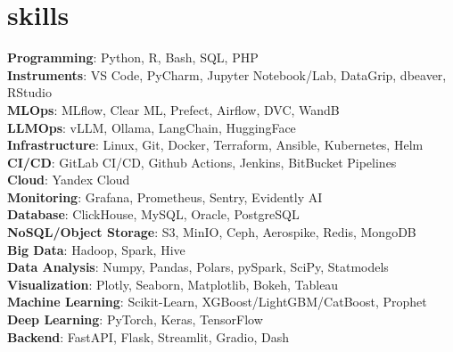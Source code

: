 \section{skills}
\begin{itemize}[leftmargin=0.15in, label={}]
  {\item{
        \textbf{Programming}{: Python, R, Bash, SQL, PHP} \\
        \textbf{Instruments}{: VS Code, PyCharm, Jupyter Notebook/Lab, DataGrip, dbeaver, RStudio} \\
        \textbf{MLOps}{: MLflow, Clear ML, Prefect, Airflow, DVC, WandB} \\
        \textbf{LLMOps}{: vLLM, Ollama, LangChain, HuggingFace} \\
        \textbf{Infrastructure}{: Linux, Git, Docker, Terraform, Ansible, Kubernetes, Helm} \\
        \textbf{CI/CD}{: GitLab CI/CD, Github Actions, Jenkins, BitBucket Pipelines} \\
        \textbf{Cloud}{: Yandex Cloud} \\
        \textbf{Monitoring}{: Grafana, Prometheus, Sentry, Evidently AI} \\
        \textbf{Database}{: ClickHouse, MySQL, Oracle, PostgreSQL} \\
        \textbf{NoSQL/Object Storage}{: S3, MinIO, Ceph, Aerospike, Redis, MongoDB} \\
        \textbf{Big Data}{: Hadoop, Spark, Hive} \\
        \textbf{Data Analysis}{: Numpy, Pandas, Polars, pySpark, SciPy, Statmodels} \\
        \textbf{Visualization}{: Plotly, Seaborn, Matplotlib, Bokeh, Tableau} \\
        \textbf{Machine Learning}{: Scikit-Learn, XGBoost/LightGBM/CatBoost, Prophet} \\
        \textbf{Deep Learning}{: PyTorch, Keras, TensorFlow} \\
        \textbf{Backend}{: FastAPI, Flask, Streamlit, Gradio, Dash} \\
        }}
\end{itemize}